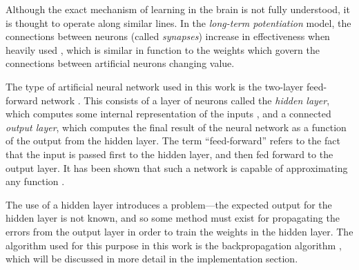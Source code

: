 Although the exact mechanism of learning in the brain is not fully understood, it is thought to operate along similar lines.  In the \emph{long-term potentiation} model, the connections between neurons (called \emph{synapses}) increase in effectiveness when heavily used \cite[p. 271]{Vander}, which is similar in function to the weights which govern the connections between artificial neurons changing value.


The type of artificial neural network used in this work is the two-layer feed-forward network \cite[p. 4]{Aleksander1995}.  This consists of a layer of neurons called the \emph{hidden layer}, which computes some internal representation of the inputs \cite[p. 135]{Aleksander1995}, and a connected \emph{output layer}, which computes the final result of the neural network as a function of the output from the hidden layer.  The term ``feed-forward'' refers to the fact that the input is passed first to the hidden layer, and then fed forward to the output layer.  It has been shown that such a network is capable of approximating any function \cite[p. 10]{Annema1995}.


The use of a hidden layer introduces a problem---the expected output for the hidden layer is not known, and so some method must exist for propagating the errors from the output layer in order to train the weights in the hidden layer.  The algorithm used for this purpose in this work is the backpropagation algorithm \cite[pp. 134--149]{Aleksander1995}, which will be discussed in more detail in the implementation section.

